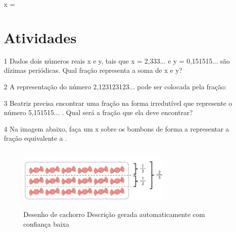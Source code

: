 \begin{escolha}
{x = 
}


\section{Atividades}

\num{1} Dados dois números reais x e y, tais que x = 2,333... e y =
0,151515... são dízimas periódicas. Qual fração representa a soma de x
e y?


\num{2} A representação do número 2,123123123... pode ser colocada pela
fração:

\begin{boxmedio}

\num{3} Beatriz precisa encontrar uma fração na forma irredutível que
represente o número 5,151515... . Qual será a fração que ela deve
encontrar?

\begin{boxmedio}

\num{4} Na imagem abaixo, faça um x sobre os bombons de forma a
representar a fração equivalente a .


\begin{figure}
\centering
\includegraphics[width=2.9871in,height=1.23958in]{./_SAEB_9_MAT/media/image43.png}
\caption{Desenho de cachorro Descrição gerada automaticamente com
confiança baixa}
\end{figure}

\end{boxmedio}
\end{boxmedio}
\end{escolha}
